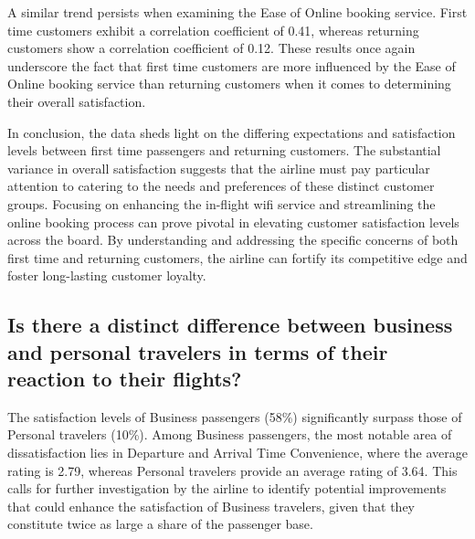 \documentclass[11pt]{article}
\begin{document}
A similar trend persists when examining the Ease of Online booking service. First time customers exhibit a correlation coefficient of \num{0.41}, whereas returning customers show a correlation coefficient of \num{0.12}. These results once again underscore the fact that first time customers are more influenced by the Ease of Online booking service than returning customers when it comes to determining their overall satisfaction.


In conclusion, the data sheds light on the differing expectations and satisfaction levels between first time passengers and returning customers. The substantial variance in overall satisfaction suggests that the airline must pay particular attention to catering to the needs and preferences of these distinct customer groups. Focusing on enhancing the in-flight wifi service and streamlining the online booking process can prove pivotal in elevating customer satisfaction levels across the board. By understanding and addressing the specific concerns of both first time and returning customers, the airline can fortify its competitive edge and foster long-lasting customer loyalty.

    \hypertarget{question-7.4}{%
\subsection{Is there a distinct
difference between business and personal travelers in terms of their
reaction to their
flights?}\label{question-7.4}}

The satisfaction levels of Business passengers (58\%) significantly surpass those of Personal travelers (10\%). Among Business passengers, the most notable area of dissatisfaction lies in Departure and Arrival Time Convenience, where the average rating is 2.79, whereas Personal travelers provide an average rating of 3.64. This calls for further investigation by the airline to identify potential improvements that could enhance the satisfaction of Business travelers, given that they constitute twice as large a share of the passenger base.
\end{document}

